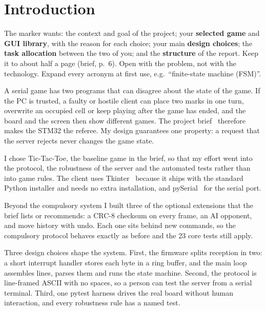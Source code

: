 \section{Introduction}
\label{sec:intro}

\begin{guidance}
The marker wants: the context and goal of the project; your \textbf{selected
game} and \textbf{GUI library}, with the reason for each choice; your main
\textbf{design choices}; the \textbf{task allocation} between the two of you; and
the \textbf{structure} of the report. Keep it to about half a page (brief,
p.~6). Open with the problem, not with the technology. Expand every acronym at
first use, e.g.\ ``finite-state machine (FSM)''.
\end{guidance}

A serial game has two programs that can disagree about the state of the game.
If the PC is trusted, a faulty or hostile client can place two marks in one
turn, overwrite an occupied cell or keep playing after the game has ended, and
the board and the screen then show different games. The project brief~\cite{brief}
therefore makes the STM32 the referee. My design guarantees one property: a
request that the server rejects never changes the game state.

I chose Tic-Tac-Toe, the baseline game in the brief, so that my effort went
into the protocol, the robustness of the server and the automated tests rather
than into game rules. %
The client uses Tkinter~\cite{tkinter} because it ships with the standard
Python installer and needs no extra installation, and pySerial~\cite{pyserial}
for the serial port. %

Beyond the compulsory system I built three of the optional extensions that
the brief lists or recommends: a CRC-8 checksum on every frame, an AI opponent,
and move history with undo. Each one sits behind new commands, so the compulsory
protocol behaves exactly as before and the 23 core tests still apply.

Three design choices shape the system. First, the firmware splits reception in
two: a short interrupt handler stores each byte in a ring buffer, and the main
loop assembles lines, parses them and runs the state machine. Second, the
protocol is line-framed ASCII with no spaces, so a person can test the server
from a serial terminal. Third, one pytest harness drives the real board
without human interaction, and every robustness rule has a named test.

